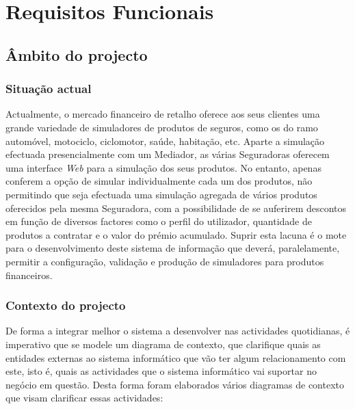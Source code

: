 \chapter{Requisitos Funcionais}

\section{Âmbito do projecto}

\subsection{Situação actual}

Actualmente, o mercado financeiro de retalho oferece aos seus clientes uma grande variedade de simuladores de produtos de seguros, como os do ramo automóvel, motociclo, ciclomotor, saúde, habitação, etc. Aparte a simulação efectuada presencialmente com um Mediador, as várias Seguradoras oferecem uma interface \emph{Web} para a simulação dos seus produtos. No entanto, apenas conferem a opção de simular individualmente cada um dos produtos, não permitindo que seja efectuada uma simulação agregada de vários produtos oferecidos pela mesma Seguradora, com a possibilidade de se auferirem descontos em função de diversos factores como o perfil do utilizador, quantidade de produtos a contratar e o valor do prémio acumulado. Suprir esta lacuna é o mote para o desenvolvimento deste sistema de informação que deverá, paralelamente, permitir a configuração, validação e produção de simuladores para produtos financeiros.

\subsection{Contexto do projecto}

De forma a integrar melhor o sistema a desenvolver nas actividades quotidianas, é imperativo que se modele um diagrama de contexto, que clarifique quais as entidades externas ao sistema informático que vão ter algum relacionamento com este, isto é, quais as actividades que o sistema informático vai suportar no negócio em questão. Desta forma foram elaborados vários diagramas de contexto que visam clarificar essas actividades:

